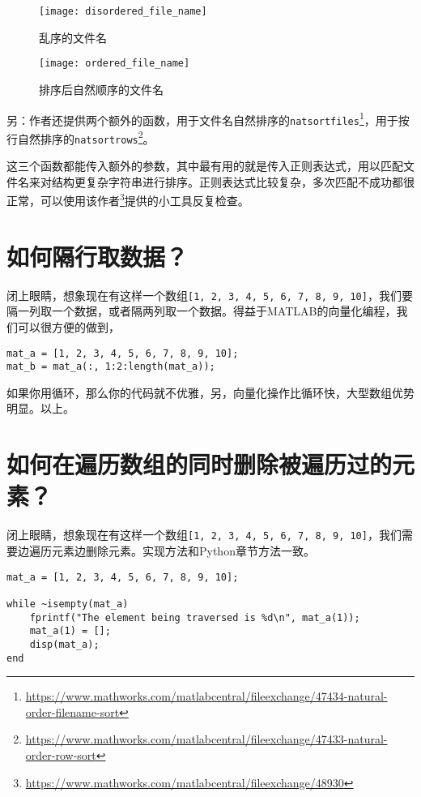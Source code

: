 \begin{figure}[h]
    \centering
    \begin{minipage}{0.45\textwidth}
        \centering
        \texttt{[image: disordered\_file\_name]}
        \caption{乱序的文件名}
    \end{minipage}
    \begin{minipage}{0.45\textwidth}
        \centering
        \texttt{[image: ordered\_file\_name]}
        \caption{排序后自然顺序的文件名}
    \end{minipage}
\end{figure}

另：作者还提供两个额外的函数，用于文件名自然排序的\texttt{natsortfiles}\footnote{\url{https://www.mathworks.com/matlabcentral/fileexchange/47434-natural-order-filename-sort}}，用于按行自然排序的\texttt{natsortrows}\footnote{\url{https://www.mathworks.com/matlabcentral/fileexchange/47433-natural-order-row-sort}}。

这三个函数都能传入额外的参数，其中最有用的就是传入正则表达式，用以匹配文件名来对结构更复杂字符串进行排序。正则表达式比较复杂，多次匹配不成功都很正常，可以使用该作者\footnote{\url{https://www.mathworks.com/matlabcentral/fileexchange/48930}}提供的小工具反复检查。

\section{如何隔行取数据？}

闭上眼睛，想象现在有这样一个数组\texttt{[1, 2, 3, 4, 5, 6, 7, 8, 9, 10]}，我们要隔一列取一个数据，或者隔两列取一个数据。得益于MATLAB的向量化编程，我们可以很方便的做到，

\begin{verbatim}
mat_a = [1, 2, 3, 4, 5, 6, 7, 8, 9, 10];
mat_b = mat_a(:, 1:2:length(mat_a));
\end{verbatim}

如果你用循环，那么你的代码就不优雅，另，向量化操作比循环快，大型数组优势明显。以上。

\section{如何在遍历数组的同时删除被遍历过的元素？}

闭上眼睛，想象现在有这样一个数组\texttt{[1, 2, 3, 4, 5, 6, 7, 8, 9, 10]}，我们需要边遍历元素边删除元素。实现方法和Python章节方法一致。

\begin{verbatim}
mat_a = [1, 2, 3, 4, 5, 6, 7, 8, 9, 10];

while ~isempty(mat_a)
    fprintf("The element being traversed is %d\n", mat_a(1));
    mat_a(1) = [];
    disp(mat_a);
end
\end{verbatim}

